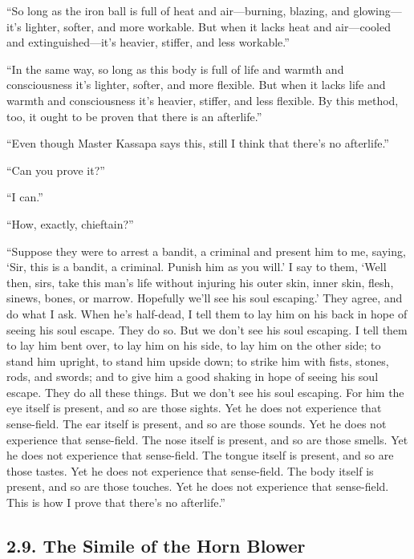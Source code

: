 \documentclass[12pt,openany]{book}%
\begin{document}
“So long as the iron ball is full of heat and air—burning, blazing, and glowing—it’s lighter, softer, and more workable. But when it lacks heat and air—cooled and extinguished—it’s heavier, stiffer, and less workable.” 

“In the same way, so long as this body is full of life and warmth and consciousness it’s lighter, softer, and more flexible. But when it lacks life and warmth and consciousness it’s heavier, stiffer, and less flexible. By this method, too, it ought to be proven that there is an afterlife.” 

“Even though Master Kassapa says this, still I think that there’s no afterlife.” 

“Can you prove it?” 

“I can.” 

“How, exactly, chieftain?” 

“Suppose they were to arrest a bandit, a criminal and present him to me, saying, ‘Sir, this is a bandit, a criminal. Punish him as you will.’ I say to them, ‘Well then, sirs, take this man’s life without injuring his outer skin, inner skin, flesh, sinews, bones, or marrow. Hopefully we’ll see his soul escaping.’ They agree, and do what I ask. When he’s half-dead, I tell them to lay him on his back in hope of seeing his soul escape. They do so. But we don’t see his soul escaping. I tell them to lay him bent over, to lay him on his side, to lay him on the other side; to stand him upright, to stand him upside down; to strike him with fists, stones, rods, and swords; and to give him a good shaking in hope of seeing his soul escape. They do all these things. But we don’t see his soul escaping. For him the eye itself is present, and so are those sights. Yet he does not experience that sense-field. The ear itself is present, and so are those sounds. Yet he does not experience that sense-field. The nose itself is present, and so are those smells. Yet he does not experience that sense-field. The tongue itself is present, and so are those tastes. Yet he does not experience that sense-field. The body itself is present, and so are those touches. Yet he does not experience that sense-field. This is how I prove that there’s no afterlife.” 

\subsection*{2.9. The Simile of the Horn Blower }
\end{document}
